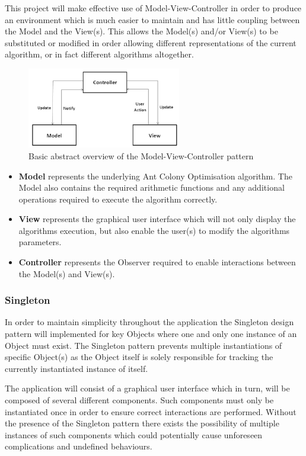 \documentclass[10pt,a4paper]{article}
\begin{document}
This project will make effective use of Model-View-Controller in order to produce an environment which is much easier to maintain and has little coupling between the Model and the View(s). This allows the Model(s) and/or View(s) to be substituted or modified in order allowing different representations of the current algorithm, or in fact different algorithms altogether. 

\begin{figure}[h]
\centering
\includegraphics[width=0.6\textwidth]{MVC}
\caption{Basic abstract overview of the Model-View-Controller pattern}
\end{figure}

\begin{itemize}
\item \textbf{Model} represents the underlying Ant Colony Optimisation algorithm. The Model also contains the required arithmetic functions and any additional operations required to execute the algorithm correctly.
\item \textbf{View} represents the graphical user interface which will not only display the algorithms execution, but also enable the user(s) to modify the algorithms parameters.
\item \textbf{Controller} represents the Observer required to enable interactions between the Model(s) and View(s).
\end{itemize}
\noindent

\subsubsection{Singleton}
\label{sssec:singleton}
In order to maintain simplicity throughout the application the Singleton design pattern will implemented for key Objects where one and only one instance of an Object must exist. The Singleton pattern prevents multiple instantiations of specific Object(s) as the Object itself is solely responsible for tracking the currently instantiated instance of itself\cite{gof:design:singleton}. 

The application will consist of a graphical user interface which in turn, will be composed of several different components. Such components must only be instantiated once in order to ensure correct interactions are performed. Without the presence of the Singleton pattern there exists the possibility of multiple instances of such components which could potentially cause unforeseen complications and undefined behaviours.
\end{document}
